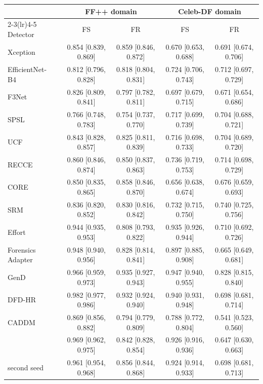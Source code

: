 \begin{tabular}{@{}l cccc@{}}
\toprule
 & \multicolumn{2}{c}{FF++ domain} & \multicolumn{2}{c}{Celeb-DF domain} \\
\cmidrule(lr){2-3}\cmidrule(lr){4-5}
Detector & FS & FR & FS & FR \\
\midrule
Xception~\cite{xception} & 0.854 [0.839, 0.869] & 0.859 [0.846, 0.872] & 0.670 [0.653, 0.688] & 0.691 [0.674, 0.706] \\
EfficientNet-B4~\cite{efficientnet} & 0.812 [0.796, 0.828] & 0.818 [0.804, 0.831] & 0.724 [0.706, 0.743] & 0.712 [0.697, 0.729] \\
F3Net~\cite{f3net} & 0.826 [0.809, 0.841] & 0.797 [0.782, 0.811] & 0.697 [0.679, 0.715] & 0.671 [0.654, 0.686] \\
SPSL~\cite{spsl} & 0.766 [0.748, 0.783] & 0.754 [0.737, 0.770] & 0.717 [0.699, 0.739] & 0.704 [0.688, 0.721] \\
UCF~\cite{ucf} & 0.843 [0.828, 0.857] & 0.825 [0.811, 0.839] & 0.716 [0.698, 0.733] & 0.704 [0.689, 0.720] \\
RECCE~\cite{recce} & 0.860 [0.846, 0.874] & 0.850 [0.837, 0.863] & 0.736 [0.719, 0.753] & 0.714 [0.698, 0.729] \\
CORE~\cite{core} & 0.850 [0.835, 0.865] & 0.858 [0.846, 0.870] & 0.656 [0.638, 0.674] & 0.676 [0.659, 0.693] \\
SRM~\cite{srm} & 0.836 [0.820, 0.852] & 0.830 [0.816, 0.842] & 0.732 [0.715, 0.750] & 0.740 [0.725, 0.756] \\
Effort~\cite{effort} & 0.944 [0.935, 0.953] & 0.808 [0.793, 0.822] & 0.935 [0.926, 0.944] & 0.710 [0.692, 0.726] \\
Forensics Adapter~\cite{forensicsadapter} & 0.948 [0.940, 0.956] & 0.828 [0.814, 0.841] & 0.897 [0.885, 0.908] & 0.665 [0.649, 0.681] \\
GenD~\cite{gend2026} & 0.966 [0.959, 0.973] & 0.935 [0.927, 0.943] & 0.947 [0.940, 0.955] & 0.828 [0.815, 0.840] \\
DFD-HR~\cite{dfdhr2026} & 0.982 [0.977, 0.986] & 0.932 [0.924, 0.940] & 0.940 [0.931, 0.948] & 0.698 [0.681, 0.714] \\
CADDM~\cite{caddm} & 0.869 [0.856, 0.882] & 0.794 [0.779, 0.809] & 0.788 [0.772, 0.804] & 0.541 [0.523, 0.560] \\
\midrule
\oursB{} & 0.969 [0.962, 0.975] & 0.842 [0.828, 0.854] & 0.926 [0.916, 0.936] & 0.647 [0.630, 0.663] \\
\quad second seed & 0.961 [0.954, 0.968] & 0.856 [0.844, 0.868] & 0.924 [0.914, 0.933] & 0.698 [0.681, 0.713] \\

\end{tabular}
